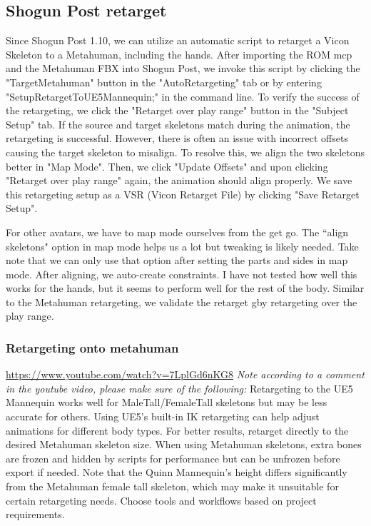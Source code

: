 \documentclass{uva-inf-article}
\begin{document}
\subsection{Shogun Post retarget}
Since Shogun Post 1.10, we can utilize an automatic script to retarget a Vicon Skeleton to a Metahuman, including the hands. After importing the ROM mcp and the Metahuman FBX into Shogun Post, we invoke this script by clicking the "TargetMetahuman" button in the "AutoRetargeting" tab or by entering "SetupRetargetToUE5Mannequin;" in the command line. To verify the success of the retargeting, we click the "Retarget over play range" button in the "Subject Setup" tab. If the source and target skeletons match during the animation, the retargeting is successful. However, there is often an issue with incorrect offsets causing the target skeleton to misalign. To resolve this, we align the two skeletons better in "Map Mode". Then, we click "Update Offsets" and upon clicking "Retarget over play range" again, the animation should align properly. We save this retargeting setup as a VSR (Vicon Retarget File) by clicking "Save Retarget Setup".

For other avatars, we have to map mode ourselves from the get go. The ``align skeletons" option in map mode helps us a lot but tweaking is likely needed. Take note that we can only use that option after setting the parts and sides in map mode. After aligning, we auto-create constraints. I have not tested how well this works for the hands, but it seems to perform well for the rest of the body. Similar to the Metahuman retargeting, we validate the retarget gby retargeting over the play range. 

\subsubsection{Retargeting onto metahuman}
\url{https://www.youtube.com/watch?v=7LplGd6nKG8}
\textit{Note according to a comment in the youtube video, please make sure of the following:}
Retargeting to the UE5 Mannequin works well for MaleTall/FemaleTall skeletons but may be less accurate for others. Using UE5's built-in IK retargeting can help adjust animations for different body types. For better results, retarget directly to the desired Metahuman skeleton size. When using Metahuman skeletons, extra bones are frozen and hidden by scripts for performance but can be unfrozen before export if needed. Note that the Quinn Mannequin’s height differs significantly from the Metahuman female tall skeleton, which may make it unsuitable for certain retargeting needs. Choose tools and workflows based on project requirements.
\end{document}
